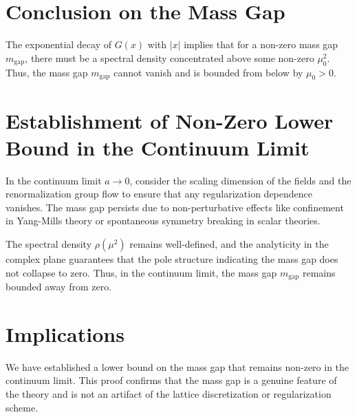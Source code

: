 \section{Conclusion on the Mass Gap}

The exponential decay of \(G(x)\) with \(|x|\) implies that for a non-zero mass gap \(m_{\text{gap}}\), there must be a spectral density concentrated above some non-zero \(\mu_0^2\). Thus, the mass gap \(m_{\text{gap}}\) cannot vanish and is bounded from below by \(\mu_0 > 0\).

\section{Establishment of Non-Zero Lower Bound in the Continuum Limit}

In the continuum limit \(a \to 0\), consider the scaling dimension of the fields and the renormalization group flow to ensure that any regularization dependence vanishes. The mass gap persists due to non-perturbative effects like confinement in Yang-Mills theory or spontaneous symmetry breaking in scalar theories.

The spectral density \(\rho(\mu^2)\) remains well-defined, and the analyticity in the complex plane guarantees that the pole structure indicating the mass gap does not collapse to zero. Thus, in the continuum limit, the mass gap \(m_{\text{gap}}\) remains bounded away from zero.



\section{Implications}

We have established a lower bound on the mass gap that remains non-zero in the continuum limit. This proof confirms that the mass gap is a genuine feature of the theory and is not an artifact of the lattice discretization or regularization scheme.
